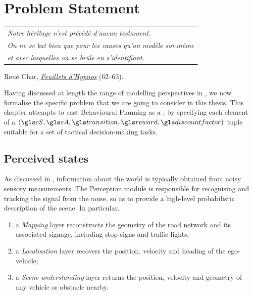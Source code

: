 
\graphicspath{{2-Chapters/3-Chapter/}}

\chapter{Problem Statement}
\label{chapter:3}

\begin{flushright}
	\begin{tabular}{@{}l@{}}
		\emph{Notre héritage n'est précédé d'aucun testament.}\\
		\emph{On ne se bat bien que pour les causes qu'on modèle soi-même}\\
		\emph{et avec lesquelles on se brûle en s'identifiant.}\\
	\end{tabular}
	
	René Char, \href{https://eleurent.github.io/sisyphe/texts/feuillets-d-hypnos.html}{\emph{Feuillets d'Hypnos}} {\small (62--63)}.
\end{flushright}


\abstractStartChapter{}%
Having discussed at length the range of  modelling perspectives in , we now formalise the specific problem that we are going to consider in this thesis. This chapter attempts to cast Behavioural Planning as a , by specifying each element of a $(\cS, \cA, \Ps, \R, \discount)$ tuple suitable for a set of tactical decision-making tasks.
\minitocStartChapter{}

\section{Perceived states}

As discussed in , information about the world is typically obtained from noisy sensory measurements. The Perception module is responsible for recognising and tracking the signal from the noise, so as to provide a high-level probabilistic description of the scene. In particular, 
\begin{enumerate}[label=(\roman*)]
	\item a \emph{Mapping} layer reconstructs the geometry of the road network and its associated signage, including stop signs and traffic lights;
	\item a \emph{Localisation} layer recovers the position, velocity and heading of the ego-vehicle;
	\item a \emph{Scene understanding} layer returns the position, velocity and geometry of any vehicle or obstacle nearby.
\end{enumerate}

